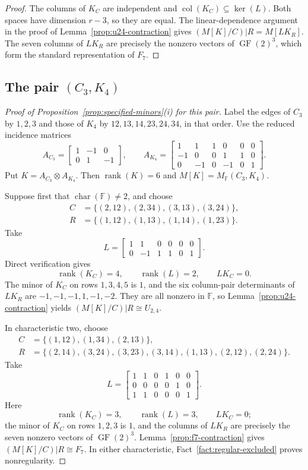 \documentclass[12pt,a4paper]{article}
\numberwithin{equation}{section}
\DeclareMathOperator{\rank}{rank}
\DeclareMathOperator{\col}{col}
\newcommand{\F}{\mathbb F}
\theoremstyle{definition}
\theoremstyle{remark}
\begin{document}
\begin{proof}
The columns of \(K_C\) are independent and
\(\col(K_C)\subseteq\ker(L)\).  Both spaces have dimension
\(r-3\), so they are equal.  The linear-dependence argument in
the proof of Lemma~\ref{prop:u24-contraction} gives
\((M[K]/C)|R=M[LK_R]\).  The seven columns of \(LK_R\) are
precisely the nonzero vectors of \(\operatorname{GF}(2)^3\), which form the
standard representation of \(F_7\).
\end{proof}

\subsection{The pair \texorpdfstring{\((C_3,K_4)\)}{(C3,K4)}}
\begin{proof}[Proof of Proposition~\ref{prop:specified-minors}\textup{(i)} for this pair]
Label the edges of \(C_3\) by \(1,2,3\) and those of \(K_4\) by
\(12,13,14,23,24,34\), in that order.  Use the reduced incidence matrices
\[
 A_{C_3}=\begin{bmatrix}1&-1&0\\0&1&-1\end{bmatrix},
 \qquad
 A_{K_4}=\begin{bmatrix}
 1&1&1&0&0&0\\-1&0&0&1&1&0\\0&-1&0&-1&0&1
 \end{bmatrix}.
\]
Put \(K=A_{C_3}\otimes A_{K_4}\).  Then \(\rank(K)=6\) and
\(M[K]=M_{\F}(C_3,K_4)\).

Suppose first that \(\operatorname{char}(\F)\ne2\), and choose
\[
\begin{aligned}
 C&=\{(2,12),(2,34),(3,13),(3,24)\},\\
 R&=\{(1,12),(1,13),(1,14),(1,23)\}.
\end{aligned}
\]
Take
\[
 L=\begin{bmatrix}
1&1&0&0&0&0\\
0&-1&1&1&0&1
\end{bmatrix}.
\]
Direct verification gives
\[
 \rank(K_C)=4,\qquad \rank(L)=2,\qquad LK_C=0.
\]
The minor of \(K_C\) on rows \(1,3,4,5\) is \(1\), and the
six column-pair determinants of \(LK_R\) are
\(-1,-1,-1,1,-1,-2\).  They are all nonzero in \(\F\), so
Lemma~\ref{prop:u24-contraction} yields
\((M[K]/C)|R\cong U_{2,4}\).

In characteristic two, choose
\[
\begin{aligned}
 C&=\{(1,12),(1,34),(2,13)\},\\
 R&=\{(2,14),(3,24),(3,23),(3,14),(1,13),(2,12),(2,24)\}.
\end{aligned}
\]
Take
\[
 L=\begin{bmatrix}
1&1&0&1&0&0\\
0&0&0&0&1&0\\
1&1&0&0&0&1
\end{bmatrix}.
\]
Here
\[
 \rank(K_C)=3,\qquad \rank(L)=3,\qquad LK_C=0;
\]
the minor of \(K_C\) on rows \(1,2,3\) is \(1\), and the columns
of \(LK_R\) are precisely the seven nonzero vectors of
\(\operatorname{GF}(2)^3\).  Lemma~\ref{prop:f7-contraction} gives
\((M[K]/C)|R\cong F_7\).  In either characteristic,
Fact~\ref{fact:regular-excluded} proves nonregularity.
\end{proof}
\end{document}
